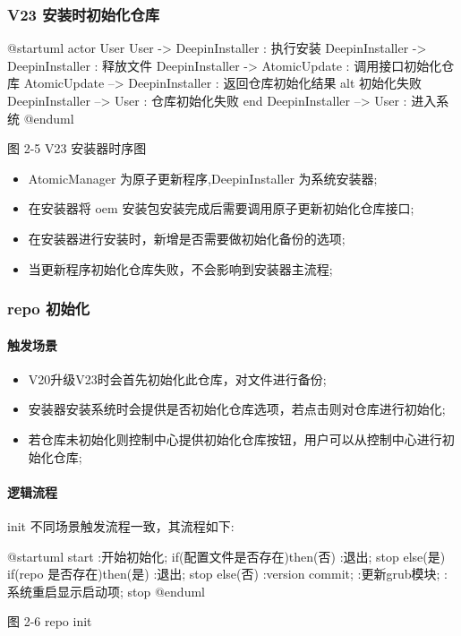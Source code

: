 \documentclass{utart}
\begin{document}
\subsubsection{V23 安装时初始化仓库}
\begin{center}
  \begin{adjustbox}{scale=0.65}
    \begin{plantuml}
      @startuml
      actor User
      User -> DeepinInstaller : 执行安装
      DeepinInstaller -> DeepinInstaller : 释放文件
      DeepinInstaller -> AtomicUpdate : 调用接口初始化仓库
      AtomicUpdate --> DeepinInstaller : 返回仓库初始化结果
      alt 初始化失败
      DeepinInstaller --> User : 仓库初始化失败
      end
      DeepinInstaller --> User : 进入系统
      @enduml
      \end{plantuml}
    \end{adjustbox}

    图 2-5 V23 安装器时序图
\end{center}
\begin{itemize}[leftmargin=4em]
  \item AtomicManager 为原子更新程序,DeepinInstaller 为系统安装器;
  \item 在安装器将 oem 安装包安装完成后需要调用原子更新初始化仓库接口;
  \item 在安装器进行安装时，新增是否需要做初始化备份的选项;
  \item 当更新程序初始化仓库失败，不会影响到安装器主流程;
\end{itemize}

\subsubsection{repo 初始化}
\paragraph{触发场景}
\begin{itemize}[leftmargin=4em]
  \item V20升级V23时会首先初始化此仓库，对文件进行备份;
  \item 安装器安装系统时会提供是否初始化仓库选项，若点击则对仓库进行初始化;
  \item 若仓库未初始化则控制中心提供初始化仓库按钮，用户可以从控制中心进行初始化仓库;
\end{itemize}
\paragraph{逻辑流程}
init 不同场景触发流程一致，其流程如下:
\begin{center}
  \begin{adjustbox}{scale=0.65}
    \begin{plantuml}
      @startuml
      start
      :开始初始化;
      if(配置文件是否存在)then(否)
      :退出;
      stop
      else(是)
      if(repo 是否存在)then(是)
      :退出;
      stop
      else(否)
      :version commit;
      :更新grub模块;
      :系统重启显示启动项;
      stop
      @enduml
    \end{plantuml}
  \end{adjustbox}

  图 2-6 repo init
\end{center}
\end{document}
